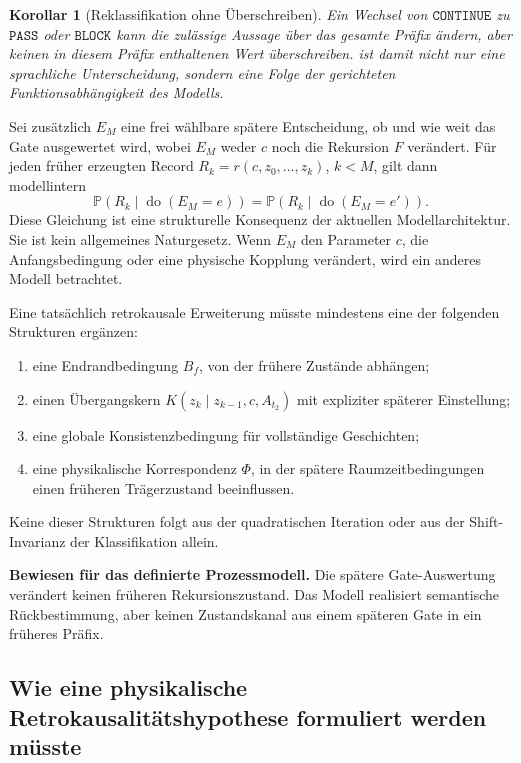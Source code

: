 \documentclass[11pt,a4paper]{article}
\newtheorem{korollar}{Korollar}[section]
\theoremstyle{remark}
\newcommand{\PASS}{\texttt{PASS}}
\newcommand{\CONTINUE}{\texttt{CONTINUE}}
\newcommand{\BLOCK}{\texttt{BLOCK}}
\newcommand{\statusbox}[2]{%
  \par\medskip\noindent
  \colorbox{#1}{\parbox{\dimexpr\linewidth-2\fboxsep\relax}{#2}}%
  \par\medskip
}
\begin{document}
\begin{korollar}[Reklassifikation ohne Überschreiben]
\label{kor:reklassifikation-ohne-ueberschreiben}
Ein Wechsel von \(\CONTINUE\) zu \(\PASS\) oder \(\BLOCK\) kann die
zulässige Aussage über das gesamte Präfix ändern, aber keinen in diesem
Präfix enthaltenen Wert überschreiben.  ist damit
nicht nur eine sprachliche Unterscheidung, sondern eine Folge der gerichteten
Funktionsabhängigkeit des Modells.
\end{korollar}

Sei zusätzlich \(E_M\) eine frei wählbare spätere Entscheidung, ob und wie
weit das Gate ausgewertet wird, wobei \(E_M\) weder \(c\) noch die Rekursion
\(F\) verändert. Für jeden früher erzeugten Record
\(R_k=r(c,z_0,\ldots,z_k)\), \(k<M\), gilt dann modellintern
\begin{equation}
\label{eq:qik-no-back-signal}
 \mathbb P(R_k\mid\operatorname{do}(E_M=e))
 =
 \mathbb P(R_k\mid\operatorname{do}(E_M=e')).
\end{equation}
Diese Gleichung ist eine strukturelle Konsequenz der aktuellen
Modellarchitektur. Sie ist kein allgemeines Naturgesetz. Wenn \(E_M\) den
Parameter \(c\), die Anfangsbedingung oder eine physische Kopplung verändert,
wird ein anderes Modell betrachtet.

Eine tatsächlich retrokausale Erweiterung müsste mindestens eine der
folgenden Strukturen ergänzen:
\begin{enumerate}
  \item eine Endrandbedingung \(B_f\), von der frühere Zustände abhängen;
  \item einen Übergangskern
  \(K(z_k\mid z_{k-1},c,A_{t_2})\) mit expliziter späterer Einstellung;
  \item eine globale Konsistenzbedingung für vollständige Geschichten;
  \item eine physikalische Korrespondenz \(\Phi\), in der spätere
  Raumzeitbedingungen einen früheren Trägerzustand beeinflussen.
\end{enumerate}
Keine dieser Strukturen folgt aus der quadratischen Iteration oder aus der
Shift-Invarianz der Klassifikation allein.

\statusbox{QGreen}{
\textbf{Bewiesen für das definierte Prozessmodell.}
Die spätere Gate-Auswertung verändert keinen früheren Rekursionszustand. Das
Modell realisiert semantische Rückbestimmung, aber keinen Zustandskanal aus
einem späteren Gate in ein früheres Präfix.
}

\subsection{Wie eine physikalische Retrokausalitätshypothese formuliert werden müsste}
\end{document}
